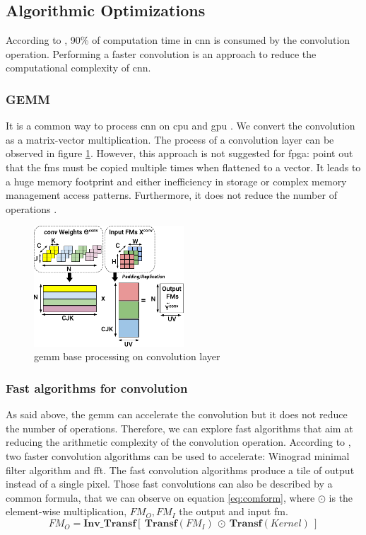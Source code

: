 \subsection{Algorithmic Optimizations} \label{subsec:algopti}
According to \textcite{shawahna_fpga-based_2019}, 90\% of computation time in \acrshort{cnn} is consumed by the convolution operation. Performing a faster convolution is an approach to reduce the computational complexity of \acrshort{cnn}. 
%
%
\subsubsection{GEMM}
%
%
It is a common way to process \acrshort{cnn} on \acrshort{cpu} and \acrshort{gpu} \cite{abdelouahab_accelerating_2018}. We convert the convolution as a matrix-vector multiplication. The process of a convolution layer can be observed in figure \ref{fig:gemm}. However, this approach is not suggested for \acrshort{fpga}: \textcite{sze_efficient_2017, zhu_efficient_2020} point out that the \acrshort{fm}s must be copied multiple times when flattened to a vector. It leads to a huge memory footprint and either inefficiency in storage or complex memory management access patterns. Furthermore, it does not reduce the number of operations \cite{liang_evaluating_2020}.
%
\begin{figure}
    \centering
    \includegraphics[width=0.5\textwidth]{Images/gemm.pdf}
    \caption{\acrshort{gemm} base processing on convolution layer \cite{abdelouahab_accelerating_2018}}
    \label{fig:gemm}
\end{figure}
%
%
\subsubsection{Fast algorithms for convolution}
%
%
As said above, the \acrshort{gemm} can accelerate the convolution but it does not reduce the number of operations. Therefore, we can explore fast algorithms that aim at reducing the arithmetic complexity of the convolution operation. According to \textcite{liang_evaluating_2020}, two faster convolution algorithms can be used to accelerate: Winograd minimal filter algorithm and \acrfull{fft}. The fast convolution algorithms produce a tile of output instead of a single pixel. Those fast convolutions can also be described by a common formula, that we can observe on equation \ref{eq:comform}, where $\odot$ is the element-wise multiplication, $FM_O, FM_I$ the output and input \acrshort{fm}.
%
\begin{equation}
FM_O = \boldsymbol{Inv\_Transf} [ \ \boldsymbol{Transf}(FM_I) \ \odot \ \boldsymbol{Transf}(Kernel) \ ]
\label{eq:comform}
\end{equation}
%
